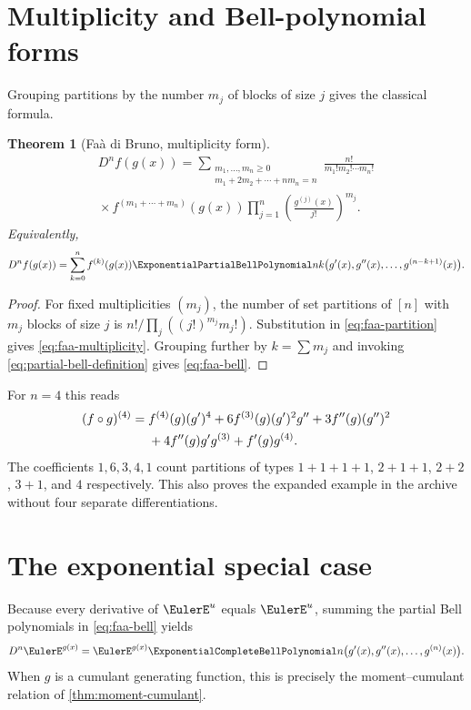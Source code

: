 \documentclass[11pt,a4paper,oneside,openany]{book}
\newtheorem{theorem}{Theorem}[chapter]
\theoremstyle{definition}
\theoremstyle{remark}
\begin{document}
\section{Multiplicity and Bell-polynomial forms}
Grouping partitions by the number $m_j$ of blocks of size $j$ gives the classical
formula.
\begin{theorem}[Fa\`a di Bruno, multiplicity form]\label{thm:faa-multiplicity}
\begin{multline}\label{eq:faa-multiplicity}
 D^n f(g(x))=
 \sum_{\substack{m_1,\ldots,m_n\ge0\\
                  m_1+2m_2+\cdots+nm_n=n}}
 \frac{n!}{m_1!m_2!\cdots m_n!}\\
 {}\times f^{(m_1+\cdots+m_n)}(g(x))
 \prod_{j=1}^{n}\left(\frac{g^{(j)}(x)}{j!}\right)^{m_j}.
\end{multline}
Equivalently,
\begin{equation}\label{eq:faa-bell}
 D^n f(g(x))=
 \sum_{k=0}^{n}f^{(k)}(g(x))
 \ExponentialPartialBellPolynomial nk\bigl(g'(x),g''(x),\ldots,g^{(n-k+1)}(x)\bigr).
\end{equation}
\end{theorem}
\begin{proof}
For fixed multiplicities $(m_j)$, the number of set partitions of $[n]$ with
$m_j$ blocks of size $j$ is
$n!/\prod_j((j!)^{m_j}m_j!)$.  Substitution in
\eqref{eq:faa-partition} gives \eqref{eq:faa-multiplicity}.  Grouping further by
$k=\sum m_j$ and invoking \eqref{eq:partial-bell-definition} gives
\eqref{eq:faa-bell}.
\end{proof}

For $n=4$ this reads
\begin{align}
 (f\circ g)^{(4)}={}&f^{(4)}(g)(g')^4
 +6f^{(3)}(g)(g')^2g''+3f''(g)(g'')^2\notag\\
 &+4f''(g)g'g^{(3)}+f'(g)g^{(4)}.
 \label{eq:faa-n4}
\end{align}
The coefficients $1,6,3,4,1$ count partitions of types
$1+1+1+1$, $2+1+1$, $2+2$, $3+1$, and $4$ respectively.  This also proves the
expanded example in the archive without four separate differentiations.

\section{The exponential special case}
Because every derivative of $\EulerE^u$ equals $\EulerE^u$, summing the partial Bell
polynomials in \eqref{eq:faa-bell} yields
\begin{equation}\label{eq:exp-faa}
 D^n \EulerE^{g(x)}=\EulerE^{g(x)}
 \ExponentialCompleteBellPolynomial n\bigl(g'(x),g''(x),\ldots,g^{(n)}(x)\bigr).
\end{equation}
When $g$ is a cumulant generating function, this is precisely the
moment--cumulant relation of \cref{thm:moment-cumulant}.
\end{document}

